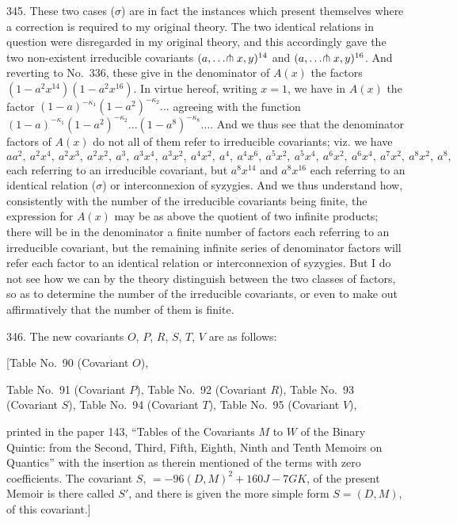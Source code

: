 \documentclass[11pt,a4paper]{article}
\begin{document}
345. These two cases ($\sigma$) are in fact the instances which present themselves where a correction is required to my original theory. The two identical relations in question were disregarded in my original theory, and this accordingly gave the two non-existent irreducible covariants $(a, \ldots \hspace{-0.2em}\pitchfork x, y)^{14}$ and $(a, \ldots \hspace{-0.2em}\pitchfork x, y)^{16}$. And reverting to No.~336, these give in the denominator of $A(x)$ the factors $(1-a^{2}x^{14})(1-a^{2}x^{16})$. In virtue hereof, writing $x=1$, we have in $A(x)$ the factor $(1-a)^{-\kappa_{1}}(1-a^{2})^{-\kappa_{2}}\ldots$ agreeing with the function $(1-a)^{-\kappa_{1}}(1-a^{2})^{-\kappa_{2}}\ldots(1-a^{8})^{-\kappa_{8}}\ldots$. And we thus see that the denominator factors of $A(x)$ do not all of them refer to irreducible covariants; viz. we have
\[
aa^{2},\ a^{2}x^{4},\ a^{2}x^{3},\ a^{2}x^{2},\ a^{3},\ a^{3}x^{4},\ a^{3}x^{2},\ a^{4}x^{2},\ a^{4},\ a^{4}x^{6},\ a^{5}x^{2},\ a^{5}x^{4},\ a^{6}x^{2},\ a^{6}x^{4},\ a^{7}x^{2},\ a^{8}x^{2},\ a^{8},
\]
each referring to an irreducible covariant, but $a^{8}x^{14}$ and $a^{8}x^{16}$ each referring to an identical relation ($\sigma$) or interconnexion of syzygies. And we thus understand how, consistently with the number of the irreducible covariants being finite, the expression for $A(x)$ may be as above the quotient of two infinite products; there will be in the denominator a finite number of factors each referring to an irreducible covariant, but the remaining infinite series of denominator factors will refer each factor to an identical relation or interconnexion of syzygies. But I do not see how we can by the theory distinguish between the two classes of factors, so as to determine the number of the irreducible covariants, or even to make out affirmatively that the number of them is finite.

346. The new covariants $O$, $P$, $R$, $S$, $T$, $V$ are as follows:

[Table No.~90 (Covariant $O$),

Table No.~91 (Covariant $P$),
Table No.~92 (Covariant $R$),
Table No.~93 (Covariant $S$),
Table No.~94 (Covariant $T$),
Table No.~95 (Covariant $V$),

printed in the paper 143, ``Tables of the Covariants $M$ to $W$ of the Binary Quintic: from the Second, Third, Fifth, Eighth, Ninth and Tenth Memoirs on Quantics'' with the insertion as therein mentioned of the terms with zero coefficients. The covariant $S$, $=-96(D,M)^{2}+160J-7GK$, of the present Memoir is there called $S'$, and there is given the more simple form $S=(D,M)$, of this covariant.]
\end{document}
